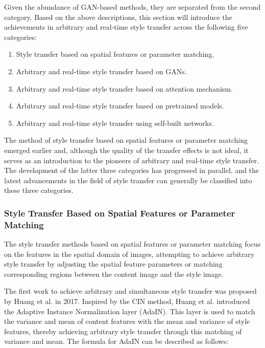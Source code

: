 \documentclass[preprint,12pt]{elsarticle}
\begin{document}
Given the abundance of GAN-based methods, they are separated from the second category. Based on the above descriptions, this section will introduce the achievements in arbitrary and real-time style transfer across the following five categories:

\begin{enumerate}
    \item Style transfer based on spatial features or parameter matching.
    \item Arbitrary and real-time style transfer based on GANs\citep{38goodfellow2014generative}.
    \item Arbitrary and real-time style transfer based on attention mechanism.
    \item Arbitrary and real-time style transfer based on pretrained models.
    \item Arbitrary and real-time style transfer using self-built networks.
\end{enumerate}

The method of style transfer based on spatial features or parameter matching emerged earlier and, although the quality of the transfer effects is not ideal, it serves as an introduction to the pioneers of arbitrary and real-time style transfer. The development of the latter three categories has progressed in parallel, and the latest advancements in the field of style transfer can generally be classified into these three categories.

\subsubsection{Style Transfer Based on Spatial Features or Parameter Matching}

The style transfer methods based on spatial features or parameter matching focus on the features in the spatial domain of images, attempting to achieve arbitrary style transfer by adjusting the spatial feature parameters or matching corresponding regions between the content image and the style image.

The first work to achieve arbitrary and simultaneous style transfer was proposed by Huang et al. in 2017\citep{04huang2017arbitrary}. Inspired by the CIN method\citep{39dumoulin2016learned}, Huang et al. introduced the Adaptive Instance Normalization layer (AdaIN). This layer is used to match the variance and mean of content features with the mean and variance of style features, thereby achieving arbitrary style transfer through this matching of variance and mean. The formula for AdaIN can be described as follows:
\end{document}
